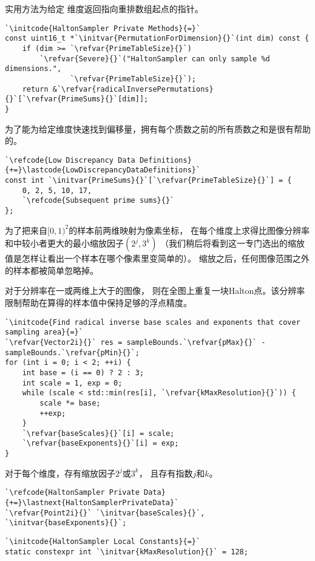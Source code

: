 实用方法为给定
维度返回指向重排数组起点的指针。
\begin{lstlisting}
`\initcode{HaltonSampler Private Methods}{=}`
const uint16_t *`\initvar{PermutationForDimension}{}`(int dim) const {
    if (dim >= `\refvar{PrimeTableSize}{}`)
        `\refvar{Severe}{}`("HaltonSampler can only sample %d dimensions.",
               `\refvar{PrimeTableSize}{}`);
    return &`\refvar{radicalInversePermutations}{}`[`\refvar{PrimeSums}{}`[dim]];
}
\end{lstlisting}

为了能为给定维度快速找到偏移量，拥有每个质数之前的所有质数之和是很有帮助的。
\begin{lstlisting}
`\refcode{Low Discrepancy Data Definitions}{+=}\lastcode{LowDiscrepancyDataDefinitions}`
const int `\initvar{PrimeSums}{}`[`\refvar{PrimeTableSize}{}`] = {
    0, 2, 5, 10, 17, 
    `\refcode{Subsequent prime sums}{}`
};
\end{lstlisting}

为了把来自$[0,1)^2$的样本前两维映射为像素坐标，
在每个维度上求得比图像分辨率
和中较小者更大的最小缩放因子$(2^j,3^k)$
（我们稍后将看到这一专门选出的缩放值是怎样让看出一个样本在哪个像素里变简单的）。
缩放之后，任何图像范围之外的样本都被简单忽略掉。

对于分辨率在一或两维上大于的图像，
则在全图上重复一块Halton点。该分辨率限制帮助在算得的样本值中保持足够的浮点精度。
\begin{lstlisting}
`\initcode{Find radical inverse base scales and exponents that cover sampling area}{=}`
`\refvar{Vector2i}{}` res = sampleBounds.`\refvar{pMax}{}` - sampleBounds.`\refvar{pMin}{}`;
for (int i = 0; i < 2; ++i) {
    int base = (i == 0) ? 2 : 3;
    int scale = 1, exp = 0;
    while (scale < std::min(res[i], `\refvar{kMaxResolution}{}`)) {
        scale *= base;
        ++exp;
    }
    `\refvar{baseScales}{}`[i] = scale;
    `\refvar{baseExponents}{}`[i] = exp;
}
\end{lstlisting}

对于每个维度，存有缩放因子$2^j$或$3^k$，
且存有指数$j$和$k$。
\begin{lstlisting}
`\refcode{HaltonSampler Private Data}{+=}\lastnext{HaltonSamplerPrivateData}`
`\refvar{Point2i}{}` `\initvar{baseScales}{}`, `\initvar{baseExponents}{}`;
\end{lstlisting}
\begin{lstlisting}
`\initcode{HaltonSampler Local Constants}{=}`
static constexpr int `\initvar{kMaxResolution}{}` = 128;
\end{lstlisting}


